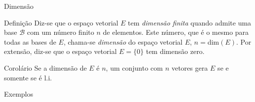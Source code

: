 \documentclass{beamer}
\begin{document}
\begin{darkframes}
\begin{frame}{Dimensão}
  \begin{block}{Definição}
    Diz-se que o espaço vetorial $E$ tem \emph{dimensão finita} quando admite uma base ${\mathcal{B}}$ com um número finito $n$ de elementos. Este número, que é o mesmo para todas as bases de $E$, chama-se \emph{dimensão} do espaço vetorial $E$, $n=$dim$(E)$. Por extensão, diz-se que o espaço vetorial $E=\{0\}$ tem dimensão zero.   
  \end{block}
\end{frame}

\begin{frame}{}
  \begin{block}{Corolário}
    Se a dimensão de $E$ é $n$, um conjunto com $n$ vetores gera $E$ se e somente se é l.i.
  \end{block}

\end{frame}

\begin{frame}{Exemplos}
\end{frame}


\end{darkframes}
\end{document}
